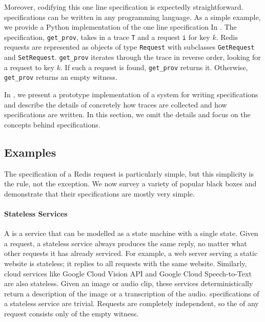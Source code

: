Moreover, codifying this one line \watprovenance{} specification is expectedly
straightforward. \Watprovenance{} specifications can be written in any
programming language. As a simple example, we provide a Python implementation
of the one line \watprovenance{} specification In .  The
specification, \texttt{get\_prov}, takes in a trace \texttt{T} and a \kvget{}
request \texttt{i} for key $k$. Redis requests are represented as objects of
type \texttt{Request} with subclasses \texttt{GetRequest} and
\texttt{SetRequest}.  \texttt{get\_prov} iterates through the trace in reverse
order, looking for a \kvset{} request to key $k$. If such a \kvset{} request is
found, \texttt{get\_prov} returns it. Otherwise, \texttt{get\_prov} returns an
empty witness.

{}

In , we present a prototype implementation of a system for
writing \watprovenance{} specifications and describe the details of concretely
how traces are collected and how \watprovenance{} specifications are written.
In this section, we omit the details and focus on the concepts behind
\watprovenance{} specifications.

\subsection{Examples}
The \watprovenance{} specification of a Redis \kvget{} request is particularly
simple, but this simplicity is the rule, not the exception. We now survey a
variety of popular black boxes and demonstrate that their \watprovenance{}
specifications are mostly very simple.

\paragraph{Stateless Services}
A  is a service that can be modelled as a state
machine with a single state. Given a request, a stateless service always
produces the same reply, no matter what other requests it has already serviced.
For example, a web server serving a static website is stateless; it replies to
all requests with the same website. Similarly, cloud services like Google Cloud
Vision API and Google Cloud Speech-to-Text are also stateless. Given an image
or audio clip, these services deterministically return a description of the
image or a transcription of the audio. \Watprovenance{} specifications of a
stateless service are trivial. Requests are completely independent, so the
\watprovenance{} of any request consists only of the empty witness.

